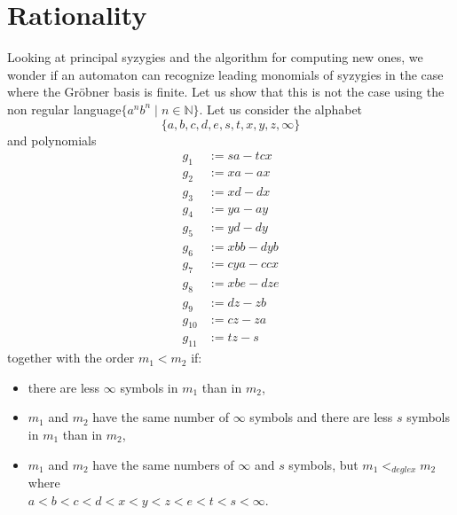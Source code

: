 \documentclass[sigconf]{acmart}
\theoremstyle{plain}
\theoremstyle{definition}
\theoremstyle{remark}
\newcommand{\N}{\mathbb{N}}
\begin{document}
\section{Rationality}

Looking at principal syzygies and the algorithm for computing new ones, we wonder if an automaton can recognize leading monomials of syzygies in the case where the Gröbner basis is finite. Let us show that this is not the case using the non regular language\linebreak $\{a^nb^n \;|\; n \in \N\}$. Let us consider the alphabet 
$$\{a, b, c, d, e, s, t, x, y, z, \infty\}$$
and polynomials
\begin{align*}
g_1 & := sa - tcx \\
g_2 & := xa - ax \\
g_3 & := xd - dx \\
g_4 & := ya - ay \\
g_5 & := yd - dy \\
g_6 & := xbb - dyb \\
g_7 & := cya - ccx \\
g_8 & := xbe - dze \\
g_9 & := dz - zb \\
g_{10} & := cz - za \\
g_{11} & := tz - s
\end{align*}
together with the order $m_1 < m_2$ if:
\begin{itemize}
\item there are less $\infty$ symbols in $m_1$ than in $m_2$,
\item $m_1$ and $m_2$ have the same number of $\infty$ symbols and there are less $s$ symbols in $m_1$ than in $m_2$,
\item $m_1$ and $m_2$ have the same numbers of $\infty$ and $s$ symbols, but
$m_1 <_{deglex} m_2$ where\\ $a < b < c < d < x < y < z < e < t < s < \infty$.
\end{itemize}
\end{document}
